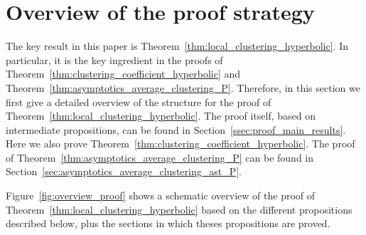 \section{Overview of the proof strategy}\label{sec:proof_outline}

The key result in this paper is Theorem~\ref{thm:local_clustering_hyperbolic}. In particular, it is the key ingredient in the proofs of Theorem~\ref{thm:clustering_coefficient_hyperbolic} and Theorem~\ref{thm:asymptotics_average_clustering_P}. Therefore, in this section we first give a detailed overview of the structure for the proof of Theorem~\ref{thm:local_clustering_hyperbolic}. The proof itself, based on intermediate propositions, can be found in Section~\ref{ssec:proof_main_results}. Here we also prove Theorem~\ref{thm:clustering_coefficient_hyperbolic}. The proof of Theorem~\ref{thm:asymptotics_average_clustering_P} can be found in Section~\ref{sec:asymptotics_average_clustering_ast_P}.

Figure~\ref{fig:overview_proof} shows a schematic overview of the proof of Theorem~\ref{thm:local_clustering_hyperbolic} based on the different propositions described below, plus the sections in which theses propositions are proved.

